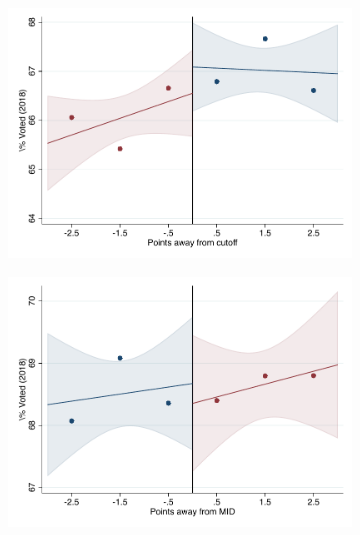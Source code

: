 \documentclass[oneside,11pt]{article}
\begin{document}
\begin{figure}[H]
\begin{center}
    \begin{subfigure}{0.475\textwidth}
        \centering
        \includegraphics[width=\textwidth]{04_Figures/rd_plot_tau_Voto_Marcado_2018_IPN3.pdf}
    \end{subfigure}
    \begin{subfigure}{0.475\textwidth}
        \centering
        \includegraphics[width=\textwidth]{04_Figures/rd_plot_mid_Voto_Marcado_2018_IPN3.pdf}
    \end{subfigure}


\end{center}
\end{figure}
\end{document}
